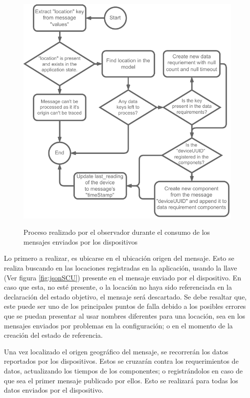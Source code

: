 \begin{figure}[ht]
    \centering
    \caption{Proceso realizado por el observador durante el consumo de los mensajes enviados por los dispositivos} 
    \includegraphics[width=0.70\linewidth]{images/LookerProcessUpdateState.pdf}
    \label{fig:LookerProcessUpdateState}
\end{figure} 

Lo primero a realizar, es ubicarse en el ubicación origen del mensaje. Esto se realiza buscando en las locaciones registradas en la aplicación, usando la llave (Ver figura \ref{fig:jsonSCU}) presente en el mensaje enviado por el dispositivo. En caso que esta, no esté presente, o la locación no haya sido referenciada en la declaración del estado objetivo, el mensaje será descartado. Se debe resaltar que, este puede ser uno de los principales puntos de falla debido a los posibles errores que se puedan presentar al usar nombres diferentes para una locación, sea en los mensajes enviados por problemas en la configuración; o en el momento de la creación del estado de referencia. 

Una vez localizado el origen geográfico del mensaje, se recorrerán los datos reportados por los dispositivos. Estos se cruzarán contra los requerimientos de datos, actualizando los tiempos de los componentes; o registrándolos en caso de que sea el primer mensaje publicado por ellos. Esto se realizará para todas los datos enviados por el dispositivo.
 
